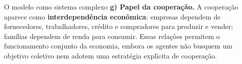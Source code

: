 \documentclass[aspectratio=169,11pt]{beamer}
\begin{document}
\begin{frame}[allowframebreaks]{O modelo como sistema complexo}
\normalsize
\textbf{g) Papel da cooperação.} A cooperação aparece como \textbf{interdependência econômica}: empresas dependem de fornecedores, trabalhadores, crédito e compradores para produzir e vender; famílias dependem de renda para consumir. Essas relações permitem o funcionamento conjunto da economia, embora os agentes não busquem um objetivo coletivo nem adotem uma estratégia explícita de cooperação.
\end{frame}
\end{document}
